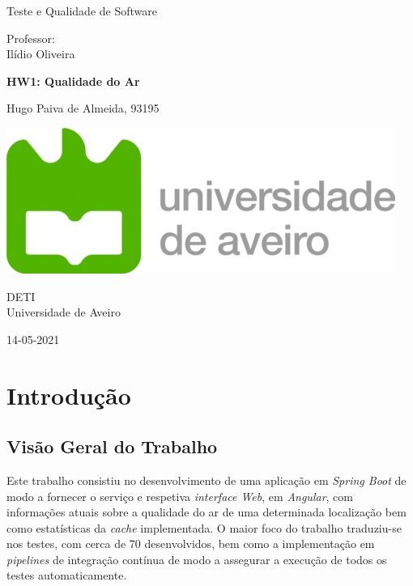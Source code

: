 \documentclass[10pt,english]{article}
\begin{document}
\begin{titlepage}
	\clearpage\thispagestyle{empty}
	\centering
	\vspace{2cm}

	
	{\Large  Teste e Qualidade de Software \par}
	\vspace{0.5cm}
	{\small Professor: \\
	Ilídio Oliveira\par}
	\vspace{4cm}
	{\Huge \textbf{HW1: Qualidade do Ar}} \\
	\vspace{1cm}
	\vspace{4cm}
	{\normalsize Hugo Paiva de Almeida, 93195
	   \par}
	\vspace{2cm}

    \includegraphics[scale=0.20]{logo_ua.png}
    
    \vspace{2cm}
    
	{\normalsize DETI \\ 
		Universidade de Aveiro \par}
		
	{\normalsize 14-05-2021 \par}
	\vspace{2cm}
		
	
	\pagebreak

\end{titlepage}
\tableofcontents{}
\clearpage

\section{Introdução}

\subsection{Visão Geral do Trabalho}

\par Este trabalho consistiu no desenvolvimento de uma aplicação em \textit{Spring Boot} de modo a fornecer o serviço e respetiva \textit{interface Web}, em \textit{Angular}, com informações atuais sobre a qualidade do ar de uma determinada localização bem como estatísticas da \textit{cache} implementada. O maior foco do trabalho traduziu-se nos testes, com cerca de 70 desenvolvidos, bem como a implementação em \textit{pipelines} de integração contínua de modo a assegurar a execução de todos os testes automaticamente.
\end{document}
